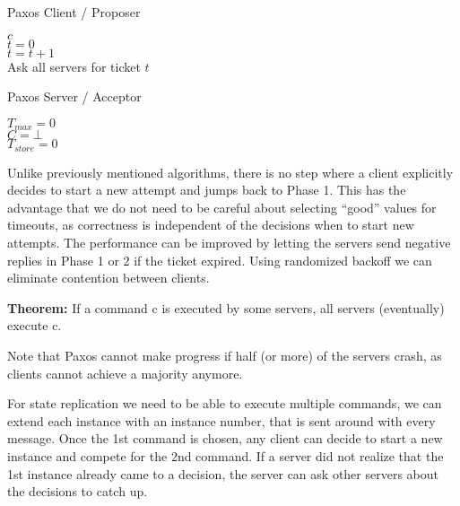 \begin{algorithm}[H]
\caption{Paxos Client / Proposer}
	$c$ 		\\
	$t = 0$ 	\\
	
	\BlankLine
	$t = t + 1$\\
	Ask all servers for ticket $t$
	
	\BlankLine
	
	\BlankLine
\end{algorithm}

\medskip

\begin{algorithm}[H]
\caption{Paxos Server / Acceptor}
	$T_{max} = 0$ 	\\
	$C = \bot$ 		\\
	$T_{store} = 0$ 	\\
	
	\BlankLine
	
	\BlankLine
	
\end{algorithm}

\medskip

Unlike previously mentioned algorithms, there is no step where a client explicitly decides to start a new attempt and jumps back to Phase 1. This has the advantage that we do not need to be careful about selecting “good” values for timeouts, as correctness is independent of the decisions when to start new attempts. The performance can be improved by letting the servers send negative replies in Phase 1 or 2 if the ticket expired. Using randomized backoff we can eliminate contention between clients. \medskip

\textbf{Theorem:} If a command c is executed by some servers, all servers (eventually) execute c. \medskip

Note that Paxos cannot make progress if half (or more) of the servers crash, as clients cannot achieve a majority anymore. \medskip

For state replication we need to be able to execute multiple commands, we can extend each instance with an instance number, that is sent around with every message. Once the 1st command is chosen, any client can decide to start a new instance and compete for the 2nd command. If a server did not realize that the 1st instance already came to a decision, the server can ask other servers about the decisions to catch up.

